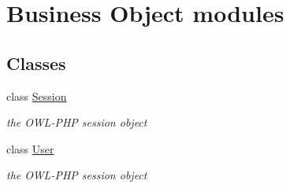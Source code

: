 \hypertarget{group__OWL__BO__LAYER}{
\section{Business Object modules}
\label{group__OWL__BO__LAYER}
}
\subsection*{Classes}
\begin{CompactItemize}
\item 
class \hyperlink{classSession}{Session}
\begin{CompactList}\small\item\em the OWL-PHP session object \item\end{CompactList}\item 
class \hyperlink{classUser}{User}
\begin{CompactList}\small\item\em the OWL-PHP session object \item\end{CompactList}\end{CompactItemize}
